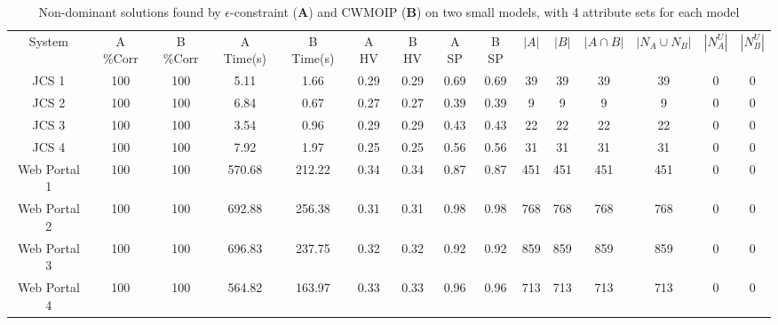 
\begin{table*}[t]
  \centering
  \scriptsize
  \vspace{-3mm}
  \caption{Non-dominant solutions found by $\epsilon$-constraint (\textbf{A})  and CWMOIP  (\textbf{B})   on two small models, with 4 attribute sets for each model}
    \begin{tabular}{|c|c|c|c|c|c|c|c|c|c|c|c|c|c|c|}
   \Xhline{2\arrayrulewidth}
    System & A \%Corr & B \%Corr & A Time(s) & B Time(s) &A HV & B HV & A SP & B SP & $|A|$ & $|B|$ & $|A \cap B|$ & \textbf{$|N_A \cup N_B|$} & \textbf{$|N^{U}_A|$} & \textbf{$|N^{U}_B|$} \bigstrut\\
   \Xhline{2\arrayrulewidth}
    JCS 1 & 100   & 100   & 5.11  & 1.66  & 0.29  & 0.29  & 0.69  & 0.69  & 39    & 39    & 39    & 39    & 0     & 0 \bigstrut\\
    \hline
    JCS 2 & 100   & 100   & 6.84  & 0.67  & 0.27  & 0.27  & 0.39  & 0.39  & 9     & 9     & 9     & 9     & 0     & 0 \bigstrut\\
    \hline
    JCS 3 & 100   & 100   & 3.54  & 0.96  & 0.29  & 0.29  & 0.43  & 0.43  & 22    & 22    & 22    & 22    & 0     & 0 \bigstrut\\
    \hline
    JCS 4 & 100   & 100   & 7.92  & 1.97  & 0.25  & 0.25  & 0.56  & 0.56  & 31    & 31    & 31    & 31    & 0     & 0 \bigstrut\\
    \hline
    Web Portal 1 & 100   & 100   & 570.68  & 212.22  & 0.34  & 0.34  & 0.87  & 0.87  & 451   & 451   & 451   & 451   & 0     & 0 \bigstrut\\
    \hline
    Web Portal 2 & 100   & 100   & 692.88  & 256.38  & 0.31  & 0.31  & 0.98  & 0.98  & 768   & 768   & 768   & 768   & 0     & 0 \bigstrut\\
    \hline
    Web Portal 3 & 100   & 100   & 696.83  & 237.75  & 0.32  & 0.32  & 0.92  & 0.92  & 859   & 859   & 859   & 859   & 0     & 0 \bigstrut\\
    \hline
    Web Portal 4 & 100   & 100   & 564.82  & 163.97  & 0.33  & 0.33  & 0.96  & 0.96  & 713   & 713   & 713   & 713   & 0     & 0 \bigstrut\\
    \hline
    \end{tabular}%
  \label{tab:naiveVScwmoip}%
\vspace{-3mm}
\end{table*}%
